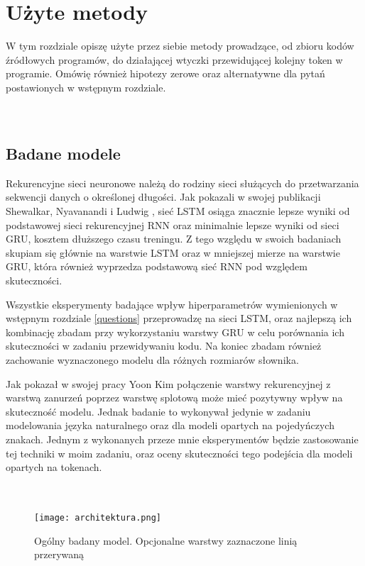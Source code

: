 \newpage %
 

\section{Użyte metody}
W tym rozdziale opiszę użyte przez siebie metody prowadzące, od zbioru kodów źródłowych programów, do działającej wtyczki 
przewidującej kolejny token w programie. Omówię również hipotezy zerowe oraz alternatywne dla pytań postawionych w wstępnym rozdziale.\\\\\\ 

\subsection{Badane modele}
Rekurencyjne sieci neuronowe należą do rodziny sieci służących do przetwarzania sekwencji danych o określonej długości. Jak pokazali w swojej publikacji 
Shewalkar, Nyavanandi i Ludwig \cite{lstmvsgru}, sieć LSTM osiąga znacznie lepsze wyniki od podstawowej sieci rekurencyjnej RNN oraz minimalnie lepsze wyniki 
od sieci GRU, kosztem dłuższego czasu treningu. Z tego względu w swoich badaniach skupiam się głównie na warstwie LSTM oraz w mniejszej mierze na warstwie GRU, 
która również wyprzedza podstawową sieć RNN pod względem skuteczności. 

Wszystkie eksperymenty badające wpływ hiperparametrów wymienionych w wstępnym rozdziale \ref{questions} przeprowadzę na sieci LSTM, oraz najlepszą ich kombinację 
zbadam przy wykorzystaniu warstwy GRU w celu porównania ich skuteczności w zadaniu przewidywaniu kodu. Na koniec zbadam również zachowanie wyznaczonego modelu 
dla różnych rozmiarów słownika. 

Jak pokazał w swojej pracy Yoon Kim \cite{kim} połączenie warstwy rekurencyjnej z warstwą zanurzeń poprzez warstwę splotową może mieć pozytywny wpływ na skuteczność 
modelu. Jednak badanie to wykonywał jedynie w zadaniu modelowania języka naturalnego oraz dla modeli opartych na pojedyńczych znakach. Jednym z wykonanych przeze mnie 
eksperymentów będzie zastosowanie tej techniki w moim zadaniu, oraz oceny skuteczności tego podejścia dla modeli opartych na tokenach. \\\\\\

\begin{figure}[!h]
	\caption{Ogólny badany model. Opcjonalne warstwy zaznaczone linią przerywaną}
    \label{fig:architektura}
    \centering \texttt{[image: architektura.png]}
\end{figure}


